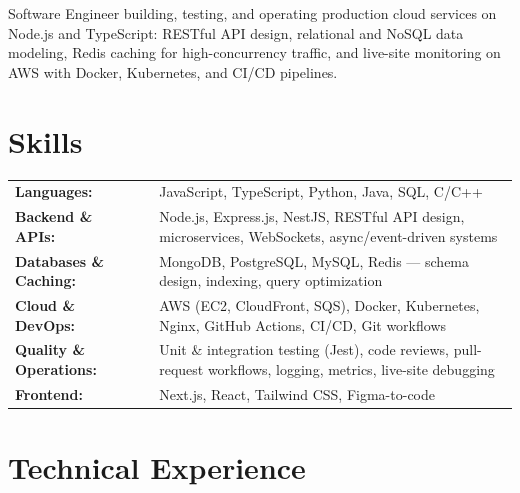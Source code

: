 \documentclass[letter,10pt]{article}
\newcommand{\skills}[1]{{\bfseries #1}}
\begin{document}
{Software Engineer building, testing, and operating production cloud services on Node.js and TypeScript: RESTful API design, relational and NoSQL data modeling, Redis caching for high-concurrency traffic, and live-site monitoring on AWS with Docker, Kubernetes, and CI/CD pipelines.}

\section{Skills}
\begin{tabular}{p{11em} p{1em} p{43em}}
\skills{Languages:} & & JavaScript, TypeScript, Python, Java, SQL, C/C++\\
\skills{Backend \& APIs:} & & Node.js, Express.js, NestJS, RESTful API design, microservices, WebSockets, async/event-driven systems\\
\skills{Databases \& Caching:} & & MongoDB, PostgreSQL, MySQL, Redis --- schema design, indexing, query optimization\\
\skills{Cloud \& DevOps:} & & AWS (EC2, CloudFront, SQS), Docker, Kubernetes, Nginx, GitHub Actions, CI/CD, Git workflows\\
\skills{Quality \& Operations:} & & Unit \& integration testing (Jest), code reviews, pull-request workflows, logging, metrics, live-site debugging\\
\skills{Frontend:} & & Next.js, React, Tailwind CSS, Figma-to-code\\
\end{tabular}

\section{Technical Experience}
\end{document}

